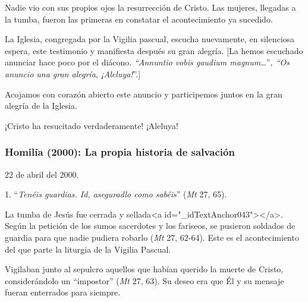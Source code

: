			\begin{body}Nadie vio con sus propios ojos la resurrección de Cristo. Las mujeres, llegadas a la tumba, fueron las primeras en constatar el acontecimiento ya sucedido.\end{body}
			
			\begin{body}La Iglesia, congregada por la Vigilia pascual, escucha nuevamente, en silenciosa espera, este testimonio y manifiesta después su gran alegría. [La hemos escuchado anunciar hace poco por el diácono. \textit{“Annuntio vobis gaudium magnum…}”\textit{, “Os anuncio una gran alegría, ¡Aleluya!}”.]\end{body}
			
			\begin{body}Acojamos con corazón abierto este anuncio y participemos juntos en la gran alegría de la Iglesia.\end{body}
			
			\begin{body}¡Cristo ha resucitado verdaderamente! ¡Aleluya!\end{body}
			
			\subsubsection{Homilía (2000): La propia historia de salvación}
			
			\begin{referencia}22 de abril del 2000.\end{referencia}
			
			\begin{body}1. “\textit{Tenéis guardias. Id, aseguradlo como sabéis}” (\textit{Mt} 27, 65).\end{body}
			
			\begin{body}La tumba de Jesús fue cerrada y sellada<a id="_idTextAnchor043"></a>. Según la petición de los sumos sacerdotes y los fariseos, se pusieron soldados de guardia para que nadie pudiera robarlo (\textit{Mt} 27, 62-64). Este es el acontecimiento del que parte la liturgia de la Vigilia Pascual.\end{body}
			
			\begin{body}Vigilaban junto al sepulcro aquellos que habían querido la muerte de Cristo, considerándolo un “impostor” (\textit{Mt }27, 63). Su deseo era que Él y su mensaje fueran enterrados para siempre.\end{body}
			
